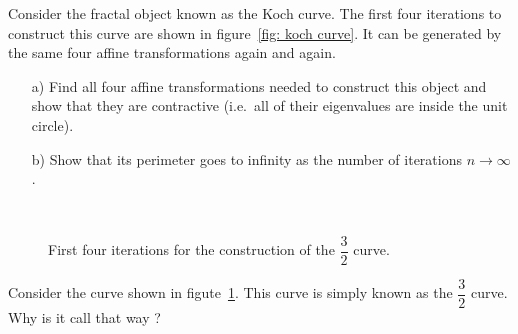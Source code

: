 \begin{problem}
  Consider the fractal object known as the Koch curve.
  The first four iterations to construct this curve are shown in figure~\ref{fig: koch curve}.
  It can be generated by the same four affine transformations again and again.

  \begin{enumerate}
  \item[a)] Find all four affine transformations needed to construct this object and show that they are contractive (i.e.\ all of their eigenvalues are inside the unit circle).

  \item[b)] Show that its perimeter goes to infinity as the number of iterations $n \to \infty$.
  \end{enumerate}
\end{problem}

\bigskip

\begin{figure}
  \centering
  \\


  \caption{First four iterations for the construction of the $\dfrac{3}{2}$ curve.}\label{fig: 3/2 curve}
\end{figure}

\begin{problem}
  Consider the curve shown in figute~\ref{fig: 3/2 curve}.
  This curve is simply known as the $\dfrac{3}{2}$ curve.
  Why is it call that way ?
\end{problem}

